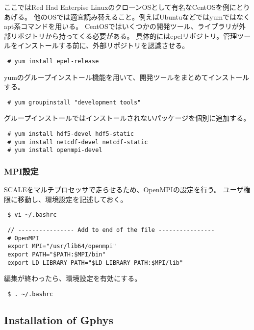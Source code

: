 ここではRed Had Enterpise LinuxのクローンOSとして有名なCentOSを例にとりあげる。
他のOSでは適宜読み替えること。例えばUbuntuなどではyumではなくapt系コマンドを用いる。
CentOSではいくつかの開発ツール、ライブラリが外部リポジトリから持ってくる必要がある。
具体的にはepelリポジトリ。管理ツールをインストールする前に、外部リポジトリを認識させる。

\begin{verbatim}
 # yum install epel-release
\end{verbatim}

yumのグループインストール機能を用いて、開発ツールをまとめてインストールする。

\begin{verbatim}
 # yum groupinstall "development tools"
\end{verbatim}

グループインストールではインストールされないパッケージを個別に追加する。

\begin{verbatim}
 # yum install hdf5-devel hdf5-static
 # yum install netcdf-devel netcdf-static
 # yum install openmpi-devel
\end{verbatim}

\subsubsection{MPI設定}

SCALEをマルチプロセッサで走らせるため、OpenMPIの設定を行う。
ユーザ権限に移動し、環境設定を記述しておく。

\begin{verbatim}
 $ vi ~/.bashrc
\end{verbatim}

\begin{verbatim}
 // ---------------- Add to end of the file ----------------
 # OpenMPI
 export MPI="/usr/lib64/openmpi"
 export PATH="$PATH:$MPI/bin"
 export LD_LIBRARY_PATH="$LD_LIBRARY_PATH:$MPI/lib"
\end{verbatim}

編集が終わったら、環境設定を有効にする。

\begin{verbatim}
 $ . ~/.bashrc
\end{verbatim}

\subsection{Installation of Gphys}

